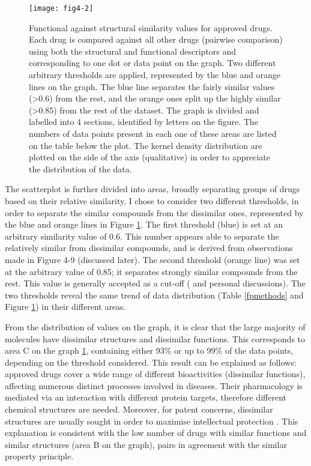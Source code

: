 \begin{figure}[H]
    \centering
    \texttt{[image: fig4-2]}
    \caption{Functional against structural similarity values for approved drugs. Each drug is compared against all other drugs (pairwise comparison) using both the structural and functional descriptors and corresponding to one dot or data point on the graph. Two different arbitrary thresholds are applied, represented by the blue and orange lines on the graph. The blue line separates the fairly similar values (\textgreater 0.6) from the rest, and the orange ones split up the highly similar (\textgreater 0.85) from the rest of the dataset. The graph is divided and labelled into 4 sections, identified by letters on the figure. The numbers of data points present in each one of these areas are listed on the table below the plot. The kernel density distribution are plotted on the side of the axis (qualitative) in order to appreciate the distribution of the data.}
    \label{fig4-2}
\end{figure}

The scatterplot is further divided into areas, broadly separating groups of drugs based on their relative similarity. I chose to consider two different thresholds, in order to separate the similar compounds from the dissimilar ones, represented by the blue and orange lines in Figure \ref{fig4-2}. The first threshold (blue) is set at an arbitrary similarity value of 0.6. This number appears able to separate the relatively similar from dissimilar compounds, and is derived from observations made in Figure 4-9 (discussed later). The second threshold (orange line) was set at the arbitrary value of 0.85; it separates strongly similar compounds from the rest. This value is generally accepted as a cut-off (\cite{chemsimwiki} and personal discussions). The two thresholds reveal the same trend of data distribution (Table \ref{fpmethods} and Figure \ref{fig4-2}) in their different areas.

From the distribution of values on the graph, it is clear that the large majority of molecules have dissimilar structures and dissimilar functions. This corresponds to area C on the graph \ref{fig4-2}, containing either 93\% or up to 99\% of the data points, depending on the threshold considered. This result can be explained as follows: approved drugs cover a wide range of different bioactivities (dissimilar functions), affecting numerous distinct processes involved in diseases. Their pharmacology is mediated via an interaction with different protein targets, therefore different chemical structures are needed. Moreover, for patent concerns, dissimilar structures are usually sought in order to maximise intellectual protection \citep{barratt2012drug}. This explanation is consistent with the low number of drugs with similar functions and similar structures (area B on the graph), pairs in agreement with the similar property principle.

